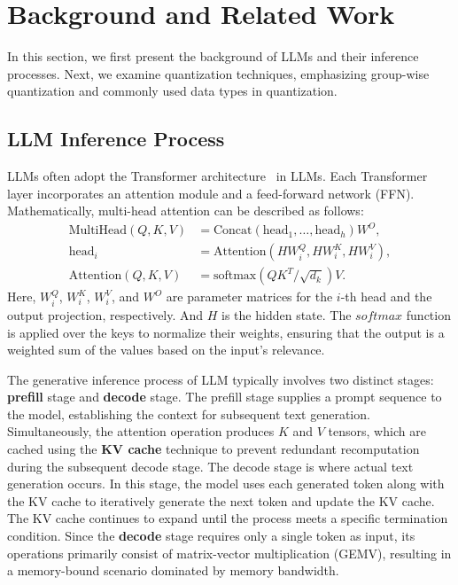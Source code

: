 \section{Background and Related Work}
\label{sec:background}


In this section, we first present the background of LLMs and their inference processes.
Next, we examine quantization techniques, emphasizing group-wise quantization and commonly used data types in quantization.

\subsection{LLM Inference Process}

LLMs often adopt the Transformer architecture~\cite{vaswani2017attention} in LLMs.
Each Transformer layer incorporates an attention module and a feed-forward network (FFN).
Mathematically, multi-head attention can be described as follows:
\begin{align*}
\text{MultiHead}(Q, K, V) &= \text{Concat}(\text{head}_1, \dots, \text{head}_h)W^O, \\
\text{head}_i &= \text{Attention}(HW_i^Q, HW_i^K, HW_i^V), \\
\text{Attention}(Q, K, V) &= \text{softmax}(QK^T/\sqrt{d_k})V.
\end{align*}
Here, $W_i^Q$, $W_i^K$, $W_i^V$, and $W^O$ are parameter matrices for the $i$-th head and the output projection, respectively. And $H$ is the hidden state. The $softmax$ function is applied over the keys to normalize their weights, ensuring that the output is a weighted sum of the values based on the input's relevance.

The generative inference process of LLM typically involves two distinct stages: \textbf{prefill} stage and \textbf{decode} stage. 
The prefill stage supplies a prompt sequence to the model, establishing the context for subsequent text generation.
Simultaneously, the attention operation produces $K$ and $V$ tensors, which are cached using the \textbf{KV cache} technique to prevent redundant recomputation during the subsequent decode stage.
The decode stage is where actual text generation occurs.
In this stage, the model uses each generated token along with the KV cache to iteratively generate the next token and update the KV cache.
The KV cache continues to expand until the process meets a specific termination condition.
Since the \textbf{decode} stage requires only a single token as input, its operations primarily consist of matrix-vector multiplication (GEMV), resulting in a memory-bound scenario dominated by memory bandwidth.


